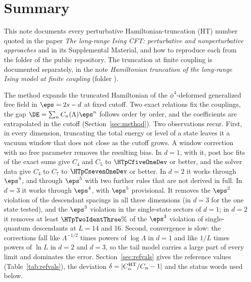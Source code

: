 \section{Summary}\label{sec:summary}
This note documents every perturbative Hamiltonian-truncation (HT) number quoted in the paper \emph{The long-range Ising
CFT: perturbative and nonperturbative approaches} and in its Supplemental Material, and how to
reproduce each from the folder  of the public repository. The truncation at finite coupling is
documented separately, in the note \emph{Hamiltonian truncation of the long-range Ising model at finite coupling}
(folder ).

The method expands the truncated Hamiltonian of the $\phi^4$-deformed generalized free field in $\eps=2s-d$ at fixed
cutoff. Two exact relations fix the couplings, the gap $\DE=\sum_nC_n(\Lambda)\eps^n$ follows order by order, and the
coefficients are extrapolated in the cutoff (Section~\ref{sec:method}). Two observations recur. First, in every
dimension, truncating the total energy or level of a state leaves it a vacuum window that does not close as the cutoff
grows. A window correction with no free parameter removes the resulting bias. In $d=1$, with it, post hoc fits of the exact
sums give $C_4$ and $C_5$ to $\HTpCfiveOneDev$ or better, and the solver data give $C_4$ to $C_7$ to
$\HTpCsevenOneDev$ or better. In $d=2$ it
works through $\eps^4$, and through $\eps^5$ with two further rules that are not derived in full. In $d=3$ it works
through $\eps^4$, with $\eps^5$ provisional. It removes the $\eps^2$ violation of the descendant spacings in all three dimensions
(in $d=3$ for the one state tested), and the $\eps^3$ violation in the single-state sectors of $d=1$; in $d=2$ it
removes at least $\HTpTwoIdentThree\%$ of the $\eps^3$ violation of single-quantum descendants at $L=14$ and 16. Second, convergence is slow: the corrections fall like
$\Lambda^{-1/2}$ times powers of $\log\Lambda$ in $d=1$ and like $1/L$ times powers of $\ln L$ in $d=2$ and $d=3$, so the
tail model carries a large part of every limit and dominates the error. Section~\ref{sec:refvals} gives the reference
values (Table~\ref{tab:refvals}), the deviation $\delta=|C_n^{\rm HT}/C_n-1|$ and the status words used below.

